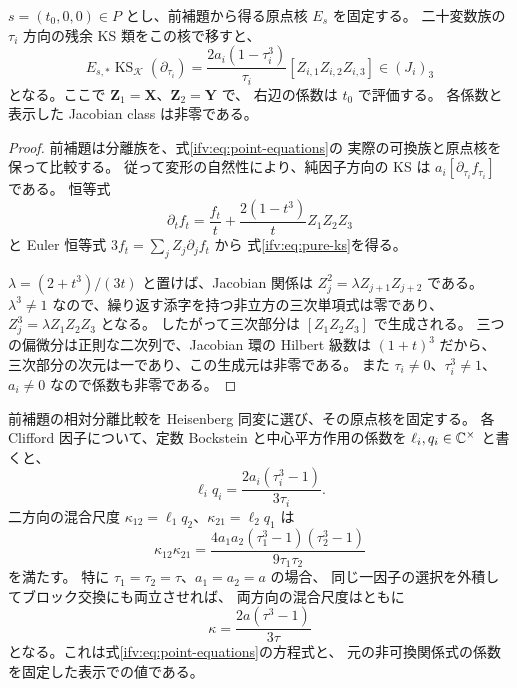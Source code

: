 \begin{proposition}[二つの純因子方向]
\label{ifv:prop:pure-tangents}
$s=(t_0,0,0)\in P$ とし、前補題から得る原点核 $E_s$ を固定する。
二十変数族の $\tau_i$ 方向の残余 KS 類をこの核で移すと、
\begin{equation}\label{ifv:eq:pure-ks}
 E_{s,*}\operatorname{KS}_{\mathcal K}(\partial_{\tau_i})
   =\frac{2a_i(1-\tau_i^3)}{\tau_i}
                   [Z_{i,1}Z_{i,2}Z_{i,3}]\in(J_i)_3
\end{equation}
となる。ここで $\mathbf Z_1=\mathbf X$、$\mathbf Z_2=\mathbf Y$ で、
右辺の係数は $t_0$ で評価する。
各係数と表示した Jacobian class は非零である。
\end{proposition}

\begin{proof}
前補題は分離族を、式\eqref{ifv:eq:point-equations}の
実際の可換族と原点核を保って比較する。
従って変形の自然性により、純因子方向の KS は
$a_i[\partial_{\tau_i}f_{\tau_i}]$ である。
恒等式
\[
        \partial_t f_t=\frac{f_t}{t}
                   +\frac{2(1-t^3)}t Z_1Z_2Z_3
\]
と Euler 恒等式 $3f_t=\sum_jZ_j\partial_jf_t$ から
式\eqref{ifv:eq:pure-ks}を得る。

$\lambda=(2+t^3)/(3t)$ と置けば、Jacobian 関係は
$Z_j^2=\lambda Z_{j+1}Z_{j+2}$ である。
$\lambda^3\ne1$ なので、繰り返す添字を持つ非立方の三次単項式は零であり、
$Z_j^3=\lambda Z_1Z_2Z_3$ となる。
したがって三次部分は $[Z_1Z_2Z_3]$ で生成される。
三つの偏微分は正則な二次列で、Jacobian 環の Hilbert 級数は $(1+t)^3$ だから、
三次部分の次元は一であり、この生成元は非零である。
また $\tau_i\ne0$、$\tau_i^3\ne1$、$a_i\ne0$ なので係数も非零である。
\end{proof}

\begin{proposition}
\label{ifv:prop:scale-calibration}
前補題の相対分離比較を Heisenberg 同変に選び、その原点核を固定する。
各 Clifford 因子について、定数 Bockstein と中心平方作用の係数を
$\ell_i,q_i\in\mathbb C^\times$ と書くと、
\begin{equation}\label{ifv:eq:block-scale}
       \ell_iq_i=\frac{2a_i(\tau_i^3-1)}{3\tau_i}.
\end{equation}
二方向の混合尺度 $\kappa_{12}=\ell_1q_2$、$\kappa_{21}=\ell_2q_1$ は
\begin{equation}\label{ifv:eq:scale-product}
 \kappa_{12}\kappa_{21}
   =\frac{4a_1a_2(\tau_1^3-1)(\tau_2^3-1)}{9\tau_1\tau_2}
\end{equation}
を満たす。
特に $\tau_1=\tau_2=\tau$、$a_1=a_2=a$ の場合、
同じ一因子の選択を外積してブロック交換にも両立させれば、
両方向の混合尺度はともに
\begin{equation}\label{ifv:eq:equal-factor-scale}
                  \kappa=\frac{2a(\tau^3-1)}{3\tau}
\end{equation}
となる。これは式\eqref{ifv:eq:point-equations}の方程式と、
元の非可換関係式の係数を固定した表示での値である。
\end{proposition}

